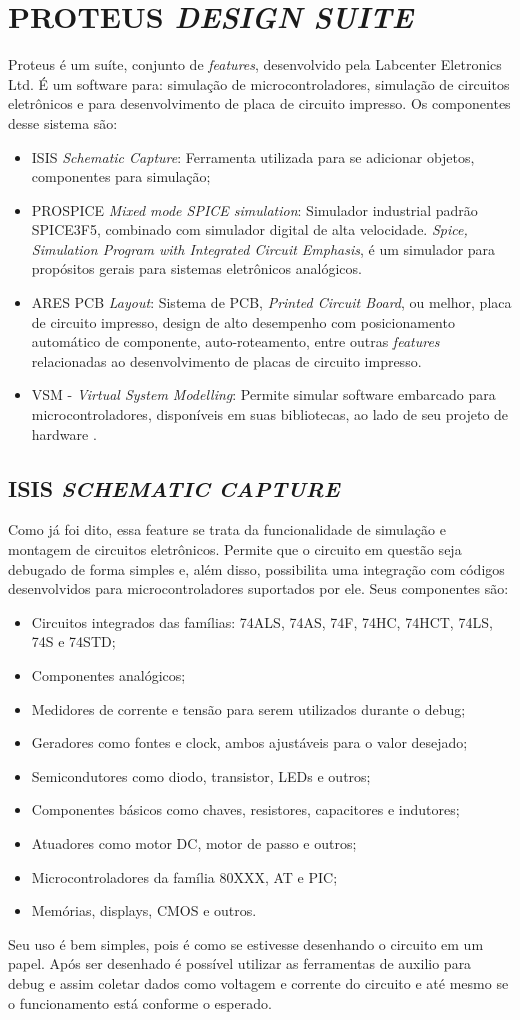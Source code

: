 \chapter{PROTEUS \emph{DESIGN SUITE}}
Proteus é um suíte, conjunto de \emph{features}, desenvolvido pela Labcenter Eletronics Ltd. É um software para: simulação de microcontroladores, simulação de circuitos eletrônicos e para desenvolvimento de placa de circuito impresso. Os componentes desse sistema são:
\begin{itemize}
\item ISIS \emph{Schematic Capture}: Ferramenta utilizada para se adicionar objetos, componentes para simulação;
\item PROSPICE \emph{Mixed mode SPICE simulation}: Simulador industrial padrão SPICE3F5, combinado com simulador digital de alta velocidade. \emph{Spice, Simulation Program with Integrated Circuit Emphasis}, é um simulador para propósitos gerais para sistemas eletrônicos analógicos.
\item ARES PCB \emph{Layout}: Sistema de PCB, \emph{Printed Circuit Board}, ou melhor, placa de circuito impresso, design de alto desempenho com posicionamento automático de componente, auto-roteamento, entre outras \emph{features} relacionadas ao desenvolvimento de placas de circuito impresso.
\item VSM - \emph{Virtual System Modelling}: Permite simular software embarcado para microcontroladores, disponíveis em suas bibliotecas, ao lado de seu projeto de hardware \cite{proteus2013, wikipedia2012spice}.
\end{itemize}

\section{ISIS \emph{SCHEMATIC CAPTURE}}
Como já foi dito, essa feature se trata da funcionalidade de simulação e montagem de circuitos eletrônicos. Permite que o circuito em questão seja debugado de forma simples e, além disso, possibilita uma integração com códigos desenvolvidos para microcontroladores suportados por ele. Seus componentes são:

\begin{itemize}
\item Circuitos integrados das famílias: 74ALS, 74AS, 74F, 74HC, 74HCT, 74LS, 74S e 74STD;
\item Componentes analógicos;
\item Medidores de corrente e tensão para serem utilizados durante o debug;
\item Geradores como fontes e clock, ambos ajustáveis para o valor desejado;
\item Semicondutores como diodo, transistor, LEDs e outros;
\item Componentes básicos como chaves, resistores, capacitores e indutores;
\item Atuadores como motor DC, motor de passo e outros;
\item Microcontroladores da família 80XXX, AT e PIC;
\item Memórias, displays, CMOS e outros.
\end{itemize}

Seu uso é bem simples, pois é como se estivesse desenhando o circuito em um papel. Após ser desenhado é possível utilizar as ferramentas de auxilio para debug e assim coletar dados como voltagem e corrente do circuito e até mesmo se o funcionamento está conforme o esperado.